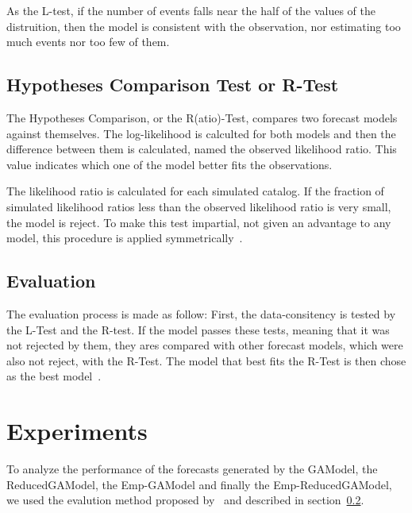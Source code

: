 As the L-test, if the number of events falls near the half of the
values of the distruition, then the model is consistent with the
observation, nor estimating too much events nor too few of them.

\subsection{Hypotheses Comparison Test or R-Test}

The Hypotheses Comparison, or the R(atio)-Test, compares two forecast
models against themselves. The log-likelihood is calculted for both
models and then the difference between them is calculated, named the
observed likelihood ratio. This value indicates which one of the model
better fits the observations.

The likelihood ratio is calculated for each simulated catalog. If the
fraction of simulated likelihood ratios less than the observed
likelihood ratio is very small, the model is reject.  To make this
test impartial, not given an advantage to any model, this procedure is
applied symmetrically~\cite{schorlemmer2010first}.


\subsection{Evaluation}\label{eval}
The evaluation process is made as follow: First, the data-consitency
is tested by the L-Test and the R-test. If the model passes these
tests, meaning that it was not rejected by them, they ares compared
with other forecast models, which were also not reject, with the
R-Test. The model that best fits the R-Test is then chose as the best
model~\cite{schorlemmer2007earthquake}.

\section{Experiments}\label{exp}

To analyze the performance of the forecasts generated by the GAModel,
the ReducedGAModel, the Emp-GAModel and finally the
Emp-ReducedGAModel, we used the evalution method proposed
by~\cite{schorlemmer2007earthquake} and described in
section~\ref{eval}.

